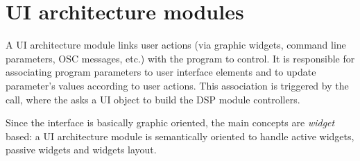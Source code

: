 % 


\section{UI architecture modules} 
\label{sec:gui}

A UI architecture module links user actions (via graphic widgets, command line parameters, OSC messages, etc.) with the \faust program to control. 
It is responsible for associating program parameters to user interface elements and to update parameter's values according to user actions. This association is triggered by the  call, where the  asks a UI object to build the DSP module controllers.

Since the interface is basically graphic oriented, the main concepts are \emph{widget} based: a UI architecture module is semantically oriented to handle active widgets, passive widgets and widgets layout.

